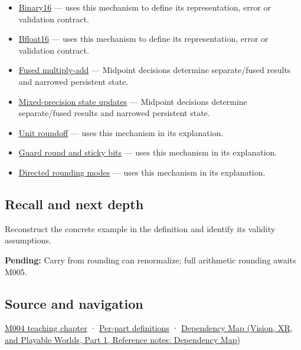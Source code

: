 \begin{itemize}
\item
  \hyperref[appendix-34443cec7170]{Binary16} --- uses this mechanism to define its representation, error or validation contract.
\item
  \hyperref[appendix-18b8dd966b5d]{Bfloat16} --- uses this mechanism to define its representation, error or validation contract.
\item
  \hyperref[appendix-41e8ef22a21e]{Fused multiply-add} --- Midpoint decisions determine separate/fused results and narrowed persistent state.
\item
  \hyperref[appendix-260182e617b7]{Mixed-precision state updates} --- Midpoint decisions determine separate/fused results and narrowed persistent state.
\item
  \hyperref[appendix-bc44f7b42f42]{Unit roundoff} --- uses this mechanism in its explanation.
\item
  \hyperref[appendix-b572b631069b]{Guard round and sticky bits} --- uses this mechanism in its explanation.
\item
  \hyperref[appendix-637d164ae5ca]{Directed rounding modes} --- uses this mechanism in its explanation.
\end{itemize}

\subsection{Recall and next depth}\label{appendix-614afe1de592-recall-and-next-depth}

\hypertarget{appendix-614afe1de592-recall-and-next-depth}{}

Reconstruct the concrete example in the definition and identify its validity assumptions.

\textbf{Pending:} Carry from rounding can renormalize; full arithmetic rounding awaits M005.

\subsection{Source and navigation}\label{appendix-614afe1de592-source-and-navigation}

\hypertarget{appendix-614afe1de592-source-and-navigation}{}

\hyperref[01-foundations-i-ch001-a-stretching-ruler-for-real-valued-quantities]{M004 teaching chapter} · \hyperref[appendix-fd090d982a15-m004---parts-61-76]{Per-part definitions} · \href{../07-Vision-XR-and-Playable-Worlds-P01/main.pdf\#appendix-4ad47bdd269a}{Dependency Map (Vision, XR, and Playable Worlds, Part 1, Reference notes: Dependency Map)}
